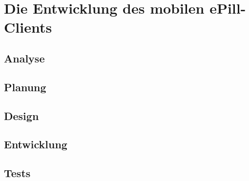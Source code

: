 \section{Die Entwicklung des mobilen ePill-Clients}
\subsection{Analyse}
\subsection{Planung}
\subsection{Design}
\subsection{Entwicklung}
\subsection{Tests}